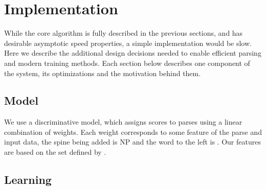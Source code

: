\section{Implementation} \label{sec:impl}

While the core algorithm is fully described in the previous sections, and has desirable asymptotic speed properties, a simple implementation would be slow.
Here we describe the additional design decisions needed to enable efficient parsing and modern training methods.
Each section below describes one component of the system, its optimizations and the motivation behind them.

\subsection{Model}

We use a discriminative model, which assigns scores to parses using a linear combination of weights.
Each weight corresponds to some feature of the parse and input data, \myeg the spine being added is NP and the word to the left is .
Our features are based on the set defined by \textcite{McDonald-etal:2005:Proj}.

\subsection{Learning}

